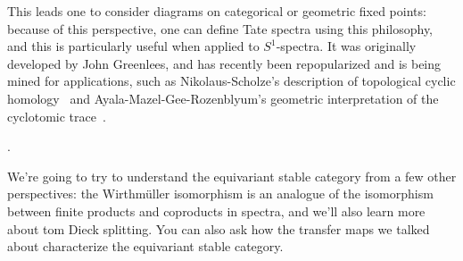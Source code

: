 This leads one to consider diagrams on categorical or geometric fixed points: because of this perspective, one can
define Tate spectra using this philosophy, and this is particularly useful when applied to $S^1$-spectra. It was
originally developed by John Greenlees, and has recently been repopularized and is being mined for applications,
such as Nikolaus-Scholze's description of topological cyclic homology~\cite{NikolausScholze} and
Ayala-Mazel-Gee-Rozenblyum's geometric interpretation of the cyclotomic trace~\cite{AMGR_ct}.

.

We're going to try to understand the equivariant stable category from a few other perspectives: the Wirthmüller
isomorphism is an analogue of the isomorphism between finite products and coproducts in spectra, and we'll also
learn more about tom Dieck splitting. You can also ask how the transfer maps we talked about
characterize the equivariant stable category.
